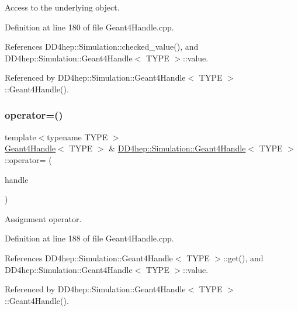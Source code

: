 Access to the underlying object. 



Definition at line 180 of file Geant4\+Handle.\+cpp.



References D\+D4hep\+::\+Simulation\+::checked\+\_\+value(), and D\+D4hep\+::\+Simulation\+::\+Geant4\+Handle$<$ T\+Y\+P\+E $>$\+::value.



Referenced by D\+D4hep\+::\+Simulation\+::\+Geant4\+Handle$<$ T\+Y\+P\+E $>$\+::\+Geant4\+Handle().

\hypertarget{class_d_d4hep_1_1_simulation_1_1_geant4_handle_a92e5bb66d347989002bc13a328502e04}{}\label{class_d_d4hep_1_1_simulation_1_1_geant4_handle_a92e5bb66d347989002bc13a328502e04} 
\subsubsection{\texorpdfstring{operator=()}{operator=()}\hspace{0.1cm}{\footnotesize\ttfamily [1/2]}}
{\footnotesize\ttfamily template$<$typename T\+Y\+PE $>$ \\
\hyperlink{class_d_d4hep_1_1_simulation_1_1_geant4_handle}{Geant4\+Handle}$<$ T\+Y\+PE $>$ \& \hyperlink{class_d_d4hep_1_1_simulation_1_1_geant4_handle}{D\+D4hep\+::\+Simulation\+::\+Geant4\+Handle}$<$ T\+Y\+PE $>$\+::operator= (\begin{DoxyParamCaption}\item[{const \hyperlink{class_d_d4hep_1_1_simulation_1_1_geant4_handle}{Geant4\+Handle}$<$ T\+Y\+PE $>$ \&}]{handle }\end{DoxyParamCaption})}



Assignment operator. 



Definition at line 188 of file Geant4\+Handle.\+cpp.



References D\+D4hep\+::\+Simulation\+::\+Geant4\+Handle$<$ T\+Y\+P\+E $>$\+::get(), and D\+D4hep\+::\+Simulation\+::\+Geant4\+Handle$<$ T\+Y\+P\+E $>$\+::value.



Referenced by D\+D4hep\+::\+Simulation\+::\+Geant4\+Handle$<$ T\+Y\+P\+E $>$\+::\+Geant4\+Handle().

